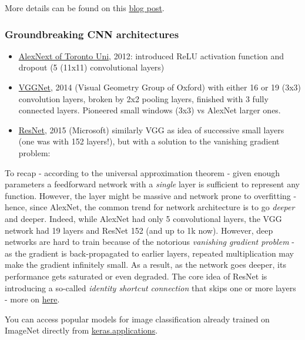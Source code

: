 \documentclass[11pt]{article}
\begin{document}
More details can be found on this \href{https://machinelearningmastery.com/image-augmentation-deep-learning-keras/}{blog post}.


\subsubsection*{Groundbreaking CNN architectures}
\begin{itemize}
	\item \href{http://papers.nips.cc/paper/4824-imagenet-classification-with-deep-convolutional-neural-networks.pdf}{AlexNext of Toronto Uni}, 2012: introduced ReLU activation function and dropout (5 (11x11) convolutional layers)
	\item \href{https://arxiv.org/pdf/1409.1556.pdf}{VGGNet}, 2014 (Visual Geometry Group of Oxford) with either 16 or 19 (3x3) convolution layers, broken by 2x2 pooling layers, finished with 3 fully connected layers. Pioneered small windows (3x3) vs AlexNet larger ones.
	\item \href{https://arxiv.org/pdf/1512.03385v1.pdf}{ResNet}, 2015 (Microsoft) similarly VGG as idea of successive small layers (one was with 152 layers!), but with a solution to the vanishing gradient problem:	
\end{itemize}

To recap - according to the universal approximation theorem - given enough parameters  a feedforward network with a \textit{single} layer is sufficient to represent any function. However, the layer might be massive and network prone to overfitting - hence, since AlexNet, the common trend for network architecture is to go \textit{deeper} and deeper. Indeed, while AlexNet had only 5 convolutional layers, the VGG network had 19 layers and ResNet 152 (and up to 1k now). However, deep networks are hard to train because of the notorious \textit{vanishing gradient problem} - as the gradient is back-propagated to earlier layers, repeated multiplication may make the gradient infinitely small. As a result, as the network goes deeper, its performance gets saturated or even degraded. The core idea of ResNet is introducing a so-called \textit{identity shortcut connection} that skips one or more layers - more on \href{https://towardsdatascience.com/an-overview-of-resnet-and-its-variants-5281e2f56035}{here}.

You can access popular models for image classification already trained on ImageNet directly from \href{https://keras.io/applications/}{keras.applications}.
\end{document}
